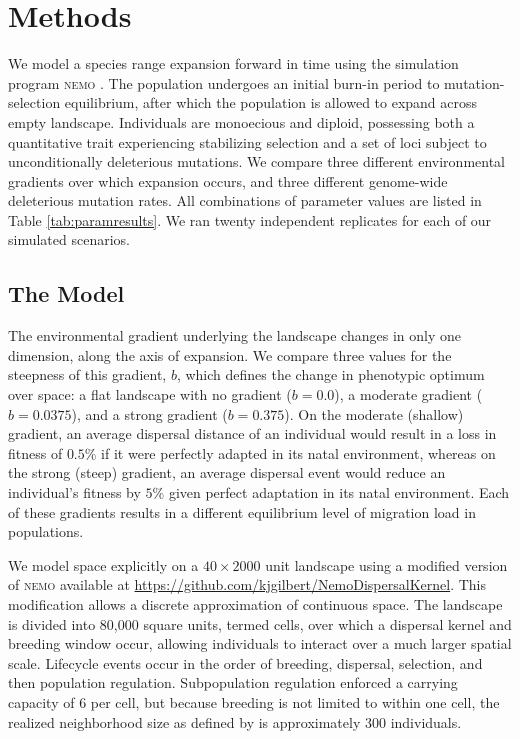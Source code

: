 \section*{Methods}


We model a species range expansion forward in time using the simulation program \textsc{nemo} \citep{Guillaume:2006}. The population undergoes an initial burn-in period to mutation-selection equilibrium, after which the population is allowed to expand across empty landscape. Individuals are monoecious and diploid, possessing both a quantitative trait experiencing stabilizing selection and a set of loci subject to unconditionally deleterious mutations. We compare three different environmental gradients over which expansion occurs, and three different genome-wide deleterious mutation rates. All combinations of parameter values are listed in Table \ref{tab:paramresults}. We ran twenty independent replicates for each of our simulated scenarios.


\subsection*{The Model}

The environmental gradient underlying the landscape changes in only one dimension, along the axis of expansion. We compare three values for the steepness of this gradient, $b$, which defines the change in phenotypic optimum over space: a flat landscape with no gradient ($b = 0.0$), a moderate gradient ($b = 0.0375$), and a strong gradient ($b = 0.375$). On the moderate (shallow) gradient, an average dispersal distance of an individual would result in a loss in fitness of $0.5\%$ if it were perfectly adapted in its natal environment, whereas on the strong (steep) gradient, an average dispersal event would reduce an individual's fitness by $5\%$ given perfect adaptation in its natal environment. Each of these gradients results in a different equilibrium level of migration load in populations.

We model space explicitly on a $40\times2000$ unit landscape using a modified version of \textsc{nemo} available at \url{https://github.com/kjgilbert/NemoDispersalKernel}. This modification allows a discrete approximation of continuous space. The landscape is divided into 80,000 square units, termed cells, over which a dispersal kernel and breeding window occur, allowing individuals to interact over a much larger spatial scale.  Lifecycle events occur in the order of breeding, dispersal, selection, and then population regulation. Subpopulation regulation enforced a carrying capacity of 6 per cell, but because breeding is not limited to within one cell, the realized neighborhood size as defined by \citet{Wright:1946} is approximately 300 individuals.

